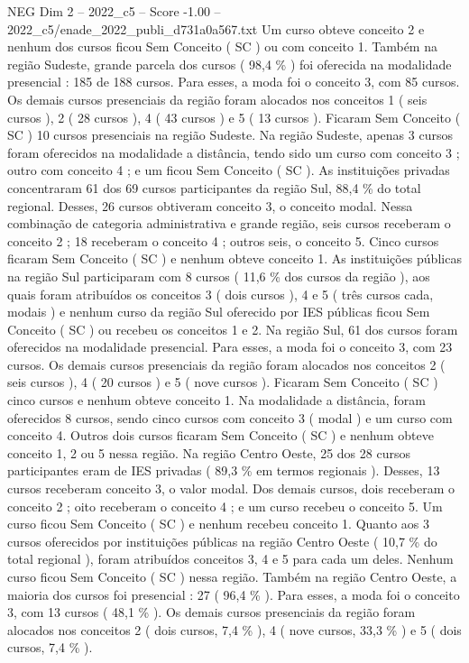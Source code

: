 \begin{textsample}{NEG Dim 2 – 2022\_c5 – Score -1.00 – 2022\_c5/enade\_2022\_publi\_d731a0a567.txt}
Um curso obteve conceito 2 e nenhum dos cursos ficou Sem Conceito ( SC ) ou com conceito 1.
Também na região Sudeste, grande parcela dos cursos ( 98,4 \% ) foi oferecida na modalidade presencial : 185 de 188 cursos.
Para esses, a moda foi o conceito 3, com 85 cursos.
Os demais cursos presenciais da região foram alocados nos conceitos 1 ( seis cursos ), 2 ( 28 cursos ), 4 ( 43 cursos ) e 5 ( 13 cursos ).
Ficaram Sem Conceito ( SC ) 10 cursos presenciais na região Sudeste.
Na região Sudeste, apenas 3 cursos foram oferecidos na modalidade a distância, tendo sido um curso com conceito 3 ; outro com conceito 4 ; e um ficou Sem Conceito ( SC ).
As instituições privadas concentraram 61 dos 69 cursos participantes da região Sul, 88,4 \% do total regional.
Desses, 26 cursos obtiveram conceito 3, o conceito modal.
Nessa combinação de categoria administrativa e grande região, seis cursos receberam o conceito 2 ; 18 receberam o conceito 4 ; outros seis, o conceito 5.
Cinco cursos ficaram Sem Conceito ( SC ) e nenhum obteve conceito 1.
As instituições públicas na região Sul participaram com 8 cursos ( 11,6 \% dos cursos da região ), aos quais foram atribuídos os conceitos 3 ( dois cursos ), 4 e 5 ( três cursos cada, modais ) e nenhum curso da região Sul oferecido por IES públicas ficou Sem Conceito ( SC ) ou recebeu os conceitos 1 e 2.
Na região Sul, 61 dos cursos foram oferecidos na modalidade presencial.
Para esses, a moda foi o conceito 3, com 23 cursos.
Os demais cursos presenciais da região foram alocados nos conceitos 2 ( seis cursos ), 4 ( 20 cursos ) e 5 ( nove cursos ).
Ficaram Sem Conceito ( SC ) cinco cursos e nenhum obteve conceito 1.
Na modalidade a distância, foram oferecidos 8 cursos, sendo cinco cursos com conceito 3 ( modal ) e um curso com conceito 4.
Outros dois cursos ficaram Sem Conceito ( SC ) e nenhum obteve conceito 1, 2 ou 5 nessa região.
Na região Centro Oeste, 25 dos 28 cursos participantes eram de IES privadas ( 89,3 \% em termos regionais ).
Desses, 13 cursos receberam conceito 3, o valor modal.
Dos demais cursos, dois receberam o conceito 2 ; oito receberam o conceito 4 ; e um curso recebeu o conceito 5.
Um curso ficou Sem Conceito ( SC ) e nenhum recebeu conceito 1.
Quanto aos 3 cursos oferecidos por instituições públicas na região Centro Oeste ( 10,7 \% do total regional ), foram atribuídos conceitos 3, 4 e 5 para cada um deles.
Nenhum curso ficou Sem Conceito ( SC ) nessa região.
Também na região Centro Oeste, a maioria dos cursos foi presencial : 27 ( 96,4 \% ).
Para esses, a moda foi o conceito 3, com 13 cursos ( 48,1 \% ).
Os demais cursos presenciais da região foram alocados nos conceitos 2 ( dois cursos, 7,4 \% ), 4 ( nove cursos, 33,3 \% ) e 5 ( dois cursos, 7,4 \% ).

\end{textsample}

